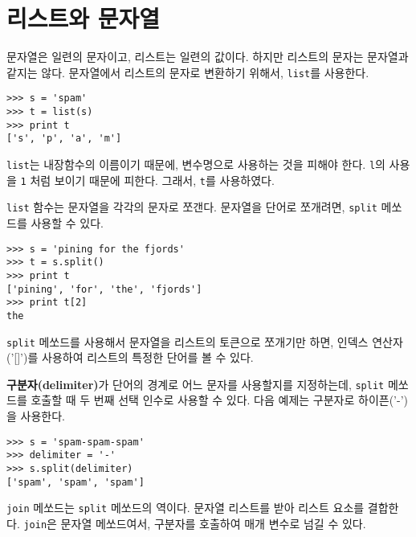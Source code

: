 \section{리스트와 문자열}


문자열은 일련의 문자이고, 리스트는 일련의 값이다. 하지만 리스트의 문자는 문자열과 같지는 않다. 문자열에서 리스트의 문자로 변환하기 위해서, 
{\tt list}를 사용한다.


\beforeverb
\begin{verbatim}
>>> s = 'spam'
>>> t = list(s)
>>> print t
['s', 'p', 'a', 'm']
\end{verbatim}
\afterverb
%

{\tt list}는 내장함수의 이름이기 때문에, 변수명으로 사용하는 것을 피해야 한다.
{\tt l}의 사용을 {\tt 1} 처럼 보이기 때문에 피한다. 그래서, {\tt t}를 사용하였다.

{\tt list} 함수는 문자열을 각각의 문자로 쪼갠다. 문자열을 단어로 쪼개려면, {\tt split} 메쏘드를 사용할 수 있다.


\beforeverb
\begin{verbatim}
>>> s = 'pining for the fjords'
>>> t = s.split()
>>> print t
['pining', 'for', 'the', 'fjords']
>>> print t[2]
the
\end{verbatim}
\afterverb
%
{\tt split} 메쏘드를 사용해서 문자열을 리스트의 토큰으로 쪼개기만 하면, 인덱스 연산자('[]')를 사용하여 리스트의 특정한 단어를 볼 수 있다.

{\bf 구분자(delimiter)}가 단어의 경계로 어느 문자를 사용할지를 지정하는데, {\tt split} 메쏘드를 호출할 때 두 번째 선택 인수로 사용할 수 있다.
다음 예제는 구분자로 하이픈('-')을 사용한다.


\beforeverb
\begin{verbatim}
>>> s = 'spam-spam-spam'
>>> delimiter = '-'
>>> s.split(delimiter)
['spam', 'spam', 'spam']
\end{verbatim}
\afterverb
%

{\tt join} 메쏘드는 {\tt split} 메쏘드의 역이다. 문자열 리스트를 받아 리스트 요소를 결합한다.
{\tt join}은 문자열 메쏘드여서, 구분자를 호출하여 매개 변수로 넘길 수 있다.


